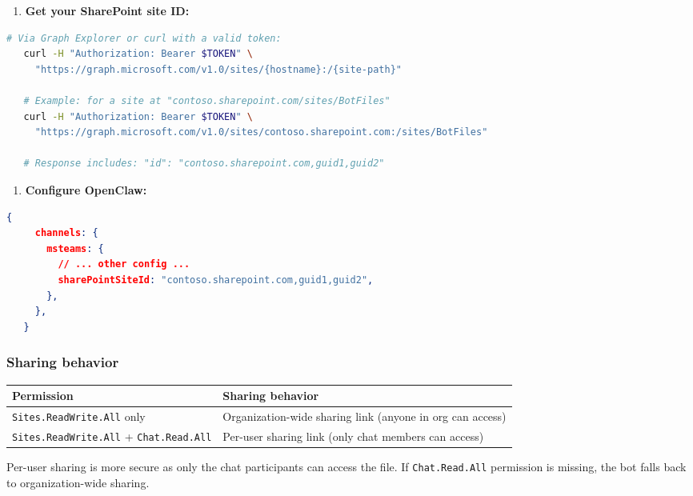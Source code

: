\begin{enumerate}
  \item \textbf{Get your SharePoint site ID:}
\end{enumerate}


\begin{lstlisting}[language=bash]
   # Via Graph Explorer or curl with a valid token:
   curl -H "Authorization: Bearer $TOKEN" \
     "https://graph.microsoft.com/v1.0/sites/{hostname}:/{site-path}"

   # Example: for a site at "contoso.sharepoint.com/sites/BotFiles"
   curl -H "Authorization: Bearer $TOKEN" \
     "https://graph.microsoft.com/v1.0/sites/contoso.sharepoint.com:/sites/BotFiles"

   # Response includes: "id": "contoso.sharepoint.com,guid1,guid2"
\end{lstlisting}


\begin{enumerate}
  \item \textbf{Configure OpenClaw:}
\end{enumerate}


\begin{lstlisting}[language=json]
   {
     channels: {
       msteams: {
         // ... other config ...
         sharePointSiteId: "contoso.sharepoint.com,guid1,guid2",
       },
     },
   }
\end{lstlisting}


\subsubsection{Sharing behavior}



\begin{table}[h]
\centering
\small
\begin{tabular}{|l|l|}
\hline
Permission & Sharing behavior \\
\hline
\texttt{Sites.ReadWrite.All} only & Organization-wide sharing link (anyone in org can access) \\
\hline
\texttt{Sites.ReadWrite.All} + \texttt{Chat.Read.All} & Per-user sharing link (only chat members can access) \\
\hline
\end{tabular}
\end{table}



Per-user sharing is more secure as only the chat participants can access the file. If \texttt{Chat.Read.All} permission is missing, the bot falls back to organization-wide sharing.

